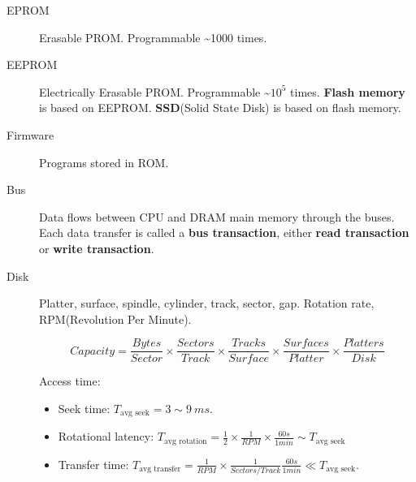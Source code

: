 \begin{description}
\item[EPROM]Erasable PROM. Programmable \~{}1000 times.
\item[EEPROM]Electrically Erasable PROM. Programmable \~{}$10^5$ times. \textbf{Flash memory} is based on EEPROM. \textbf{SSD}(Solid State Disk) is based on flash memory.
\item[Firmware]Programs stored in ROM.
\item[Bus]Data flows between CPU and DRAM main memory through the buses. Each data transfer is called a \textbf{bus transaction}, either \textbf{read transaction} or \textbf{write transaction}.
\item[Disk]Platter, surface, spindle, cylinder, track, sector, gap. Rotation rate, RPM(Revolution Per Minute).
\begin{figure}[ht]
\end{figure}
\[Capacity=\frac{Bytes}{Sector}\times\frac{Sectors}{Track}\times\frac{Tracks}{Surface}\times\frac{Surfaces}{Platter}\times\frac{Platters}{Disk}\]

Access time:
\begin{itemize}
\item Seek time: $T_{\text{avg seek}}=3\sim 9\:ms$.
\item Rotational latency: $T_{\text{avg rotation}}=\frac{1}{2}\times\frac{1}{RPM}\times\frac{60s}{1min}\sim T_{\text{avg seek}}$
\item Transfer time: $T_{\text{avg transfer}}=\frac{1}{RPM}\times\frac{1}{Sectors/Track}\frac{60s}{1min}\ll T_{\text{avg seek}}$.
\end{itemize}


\end{description}
